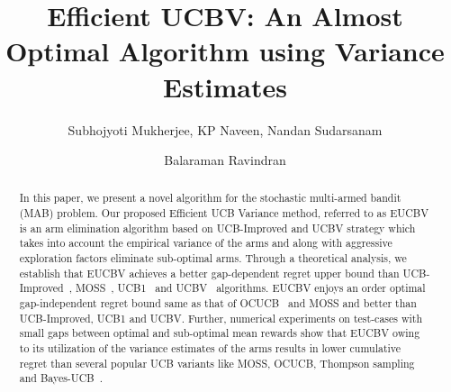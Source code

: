 \documentclass{llncs}
\begin{document}
%
\frontmatter          %
%
\pagestyle{headings}  %

\mainmatter              %
%
\title{Efficient UCBV: An Almost Optimal Algorithm using Variance Estimates}
%
%
\author{Subhojyoti Mukherjee, KP Naveen, Nandan Sudarsanam
 \and Balaraman Ravindran}
%
%
%

\maketitle              %

\begin{abstract}
In this paper, we present a novel algorithm for the stochastic multi-armed bandit (MAB) problem. Our proposed Efficient UCB Variance method, referred to as EUCBV is an arm elimination algorithm based on  UCB-Improved and UCBV strategy which takes into account the empirical variance of the arms and along  with aggressive exploration factors eliminate sub-optimal arms. Through a theoretical analysis, we establish that EUCBV achieves a better gap-dependent regret upper bound than UCB-Improved~\cite{auer2010ucb}, MOSS~\cite{audibert2009minimax}, UCB1~\cite{auer2002finite} and UCBV~\cite{audibert2009exploration} algorithms. EUCBV enjoys an order optimal gap-independent regret bound same as that of OCUCB~\cite{lattimore2015optimally} and MOSS and better than UCB-Improved, UCB1 and UCBV. Further, numerical experiments on test-cases with small gaps between optimal and sub-optimal mean rewards show that EUCBV owing to its utilization of the variance estimates of the arms results in lower cumulative regret than several popular UCB variants like MOSS, OCUCB, Thompson sampling and Bayes-UCB~\cite{kaufmann2012bayesian}. 

\end{abstract}
\end{document}
